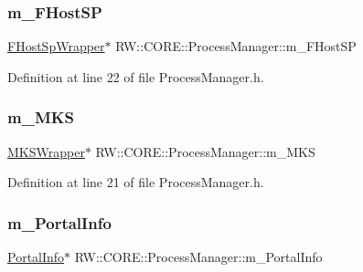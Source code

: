 \subsubsection{\texorpdfstring{m\+\_\+\+F\+Host\+SP}{m\_FHostSP}}
{\footnotesize\ttfamily \hyperlink{class_r_w_1_1_c_o_r_e_1_1_f_host_sp_wrapper}{F\+Host\+Sp\+Wrapper}$\ast$ R\+W\+::\+C\+O\+R\+E\+::\+Process\+Manager\+::m\+\_\+\+F\+Host\+SP\hspace{0.3cm}{\ttfamily [private]}}



Definition at line 22 of file Process\+Manager.\+h.

\hypertarget{class_r_w_1_1_c_o_r_e_1_1_process_manager_a42e601b8fb2073846b13fb0b5fcb6d1a}{}\label{class_r_w_1_1_c_o_r_e_1_1_process_manager_a42e601b8fb2073846b13fb0b5fcb6d1a} 
\subsubsection{\texorpdfstring{m\+\_\+\+M\+KS}{m\_MKS}}
{\footnotesize\ttfamily \hyperlink{class_r_w_1_1_c_o_r_e_1_1_m_k_s_wrapper}{M\+K\+S\+Wrapper}$\ast$ R\+W\+::\+C\+O\+R\+E\+::\+Process\+Manager\+::m\+\_\+\+M\+KS\hspace{0.3cm}{\ttfamily [private]}}



Definition at line 21 of file Process\+Manager.\+h.

\hypertarget{class_r_w_1_1_c_o_r_e_1_1_process_manager_aba833f8c7003590a66ff6118fa2cc86d}{}\label{class_r_w_1_1_c_o_r_e_1_1_process_manager_aba833f8c7003590a66ff6118fa2cc86d} 
\subsubsection{\texorpdfstring{m\+\_\+\+Portal\+Info}{m\_PortalInfo}}
{\footnotesize\ttfamily \hyperlink{class_r_w_1_1_c_o_r_e_1_1_portal_info}{Portal\+Info}$\ast$ R\+W\+::\+C\+O\+R\+E\+::\+Process\+Manager\+::m\+\_\+\+Portal\+Info\hspace{0.3cm}{\ttfamily [private]}}



